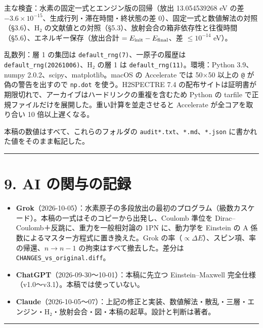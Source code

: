 \documentclass[
  a4paper,
]{ltjsarticle}
\providecommand{\tightlist}{%
  \setlength{\itemsep}{0pt}\setlength{\parskip}{0pt}}
\begin{document}
主な検査：水素の固定一式とエンジン版の回帰（放出 13.054539268 eV の差
\(-3.6\times10^{-15}\)、生成行列・滞在時間・終状態の差
0）、固定一式と数値解法の対照（§3.6）、H₂
の文献値との対照（§5.3）、放射会合の箱非依存性と往復時間（§5.6）、エネルギー保存（放出合計
\(=E_{\rm init}-E_{\rm final}\)、差 \(\le10^{-14}\) eV）。

乱数列：層 1 の集団は \texttt{default\_rng(7)}、一原子の履歴は
\texttt{default\_rng(20261006)}、H₂ の層 1 は
\texttt{default\_rng(11)}。環境：Python 3.9、numpy
2.0.2、scipy、matplotlib。macOS の Accelerate では 50×50 以上の
\texttt{@} が偽の警告を出すので \texttt{np.dot} を使う。H2SPECTRE 7.4
の配布サイトは証明書が期限切れで、アーカイブはハードリンクの重複を含むため
Python の tarfile で正規ファイルだけを展開した。重い計算を並走させると
Accelerate が全コアを取り合い 10 倍以上遅くなる。

本稿の数値はすべて、これらのフォルダの
\texttt{audit*.txt}、\texttt{*.md}、\texttt{*.json}
に書かれた値をそのまま転記した。

\begin{center}\rule{0.5\linewidth}{0.5pt}\end{center}

\section{9. AI
の関与の記録}\label{ai-ux306eux95a2ux4e0eux306eux8a18ux9332}

\begin{itemize}
\tightlist
\item
  \textbf{Grok}（2026-10-05）：水素原子の多段放出の最初のプログラム（級数カスケード）。本稿の一式はそのコピーから出発し、Coulomb
  準位を Dirac--Coulomb＋反跳に、重力を一般相対論の 1PN に、動力学を
  Einstein の A 係数によるマスター方程式に置き換えた。Grok
  の率（\(\propto\Delta E\)）、スピン項、率の帰還、\(n\to n-1\)
  の拘束はすべて撤去した。差分は \texttt{CHANGES\_vs\_original.diff}。
\item
  \textbf{ChatGPT}（2026-09-30〜10-01）：本稿に先立つ Einstein--Maxwell
  完全仕様（v1.0〜v3.1）。本稿では使っていない。
\item
  \textbf{Claude}（2026-10-05〜07）：上記の修正と実装、数値解法・散乱・三層・エンジン・H₂・放射会合・図・本稿の起草。設計と判断は著者。
\end{itemize}

\begin{center}\rule{0.5\linewidth}{0.5pt}\end{center}
\end{document}
